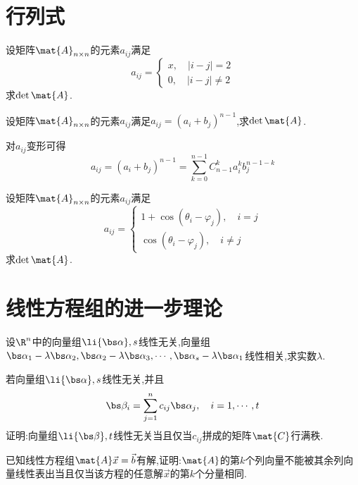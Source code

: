 \documentclass{ctexart}
\title{\tbf{Mid-Term Exam Review}}
\author{夜未央}
\begin{document}
\maketitle
\section{行列式}
\begin{problem}
    设矩阵$\mat{A}_{n\times n}$的元素$a_{ij}$满足
    \[a_{ij}=\left\{\begin{array}{l}
        x,\quad\left|i-j\right|=2\\
        0,\quad\left|i-j\right|\neq2
    \end{array}\right.\]
    求$\det\mat{A}$.
\end{problem}
\begin{solution}

\end{solution}
\begin{problem}
    设矩阵$\mat{A}_{n\times n}$的元素$a_{ij}$满足$a_{ij}=\left(a_i+b_j\right)^{n-1}$,求$\det\mat{A}$.
\end{problem}
\begin{solution}
    对$a_{ij}$变形可得
    \[a_{ij}=\left(a_i+b_j\right)^{n-1}=\sum_{k=0}^{n-1}C_{n-1}^{k}a_i^kb_j^{n-1-k}\]
    
\end{solution}
\begin{problem}
    设矩阵$\mat{A}_{n\times n}$的元素$a_{ij}$满足
    \[a_{ij}=\left\{\begin{array}{l}
        1+\cos\left(\theta_i-\varphi_j\right),\quad i=j\\
        \cos\left(\theta_i-\varphi_j\right),\quad i\neq j
    \end{array}\right.\]
    求$\det\mat{A}$.
\end{problem}

\section{线性方程组的进一步理论}
\begin{problem}
    设$\R^n$中的向量组$\li{\bs\alpha},s$线性无关,向量组$\bs\alpha_1-\lambda\bs\alpha_2,\bs\alpha_2-\lambda\bs\alpha_3,\cdots,\bs\alpha_s-\lambda\bs\alpha_1$线性相关,求实数$\lambda$.
\end{problem}
\begin{problem}
    若向量组$\li{\bs\alpha},s$线性无关,并且
    \[\bs\beta_i=\sum_{j=1}^{n}c_{ij}\bs\alpha_j,\quad i=1,\cdots,t\]
    证明:向量组$\li{\bs\beta},t$线性无关当且仅当$c_{ij}$拼成的矩阵$\mat{C}$行满秩.
\end{problem}
\begin{problem}
    已知线性方程组$\mat{A}\vec{x}=\vec{b}$有解,证明:$\mat{A}$的第$k$个列向量不能被其余列向量线性表出当且仅当该方程的任意解$\vec{x}$的第$k$个分量相同.
\end{problem}
\end{document}
